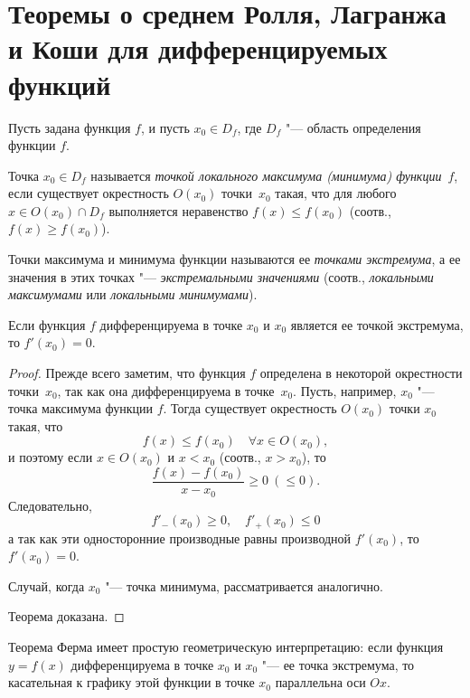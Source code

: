 \section{Теоремы о среднем Ролля, Лагранжа и Коши для дифференцируемых функций}
Пусть задана функция $f$, и пусть $x_0 \in D_f$, где $D_f$ "--- область определения функции $f$.
\begin{defn}
Точка $x_0 \in D_f$ называется \textit{точкой локального максимума (минимума) функции}~$f$, если существует окрестность $O(x_0)$ точки~$x_0$ такая, что для любого $x \in O(x_0)\cap D_f$ выполняется неравенство $f(x) \le f(x_0)$ (соотв., $f(x) \ge f(x_0)$).
\end{defn}
\begin{defn} Точки максимума и минимума функции называются ее \textit{точками экстремума}, а ее значения в этих точках "--- \textit{экстремальными значениями} (соотв., \textit{локальными максимумами} или \textit{локальными минимумами}).
\end{defn}
\begin{thm}\label{ch4n1} 
Если функция $f$ дифференцируема в точке $x_0$ и $x_0$ является ее точкой экстремума, то $f'(x_0) = 0$.
\end{thm}
\begin{proof}
Прежде всего заметим, что функция $f$ определена в некоторой окрестности точки~$x_0$, так как она дифференцируема в точке~$x_0$. Пусть, например, $x_0$ "--- точка максимума функции $f$. Тогда существует окрестность $O(x_0)$ точки $x_0$ такая, что 
$$
f(x) \le f(x_0)\quad \forall x \in O(x_0),
$$
и поэтому если $x \in O(x_0)$ и $x < x_0$ (соотв., $x > x_0$), то
$$
\frac{f(x)-f(x_0)}{x-x_0}\ge0\ (\le 0).
$$
Следовательно,
$$
f'_{-}(x_0)\ge 0, \quad f'_{+}(x_0)\le 0
$$
а так как эти односторонние производные равны производной $f'(x_0)$,
то $f'(x_0) = 0$. 

Случай, когда $x_0$ "--- точка минимума, рассматривается аналогично. 

Теорема доказана.
\end{proof}

Теорема Ферма имеет простую геометрическую интерпретацию:	если функция $y = f(x)$ дифференцируема в точке $x_0$ и $x_0$ "--- ее точка экстремума, то касательная к графику этой функции в точке $x_0$ параллельна оси $Ox$. 

